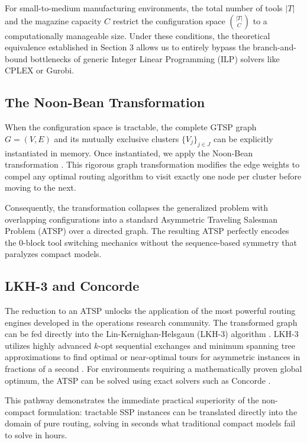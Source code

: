 \documentclass[12pt]{article}
\begin{document}
	For small-to-medium manufacturing environments, the total number of tools $|T|$ and the magazine capacity $C$ restrict the configuration space $\binom{|T|}{C}$ to a computationally manageable size. Under these conditions, the theoretical equivalence established in Section 3 allows us to entirely bypass the branch-and-bound bottlenecks of generic Integer Linear Programming (ILP) solvers like CPLEX or Gurobi.
	
	\subsection{The Noon-Bean Transformation}
	When the configuration space is tractable, the complete GTSP graph $G = (V, E)$ and its mutually exclusive clusters $\{V_j\}_{j \in J}$ can be explicitly instantiated in memory. Once instantiated, we apply the Noon-Bean transformation \parencite{Noon1993}. This rigorous graph transformation modifies the edge weights to compel any optimal routing algorithm to visit exactly one node per cluster before moving to the next.
	
	Consequently, the transformation collapses the generalized problem with overlapping configurations into a standard Asymmetric Traveling Salesman Problem (ATSP) over a directed graph. The resulting ATSP perfectly encodes the 0-block tool switching mechanics without the sequence-based symmetry that paralyzes compact models.
	
	\subsection{LKH-3 and Concorde}
	The reduction to an ATSP unlocks the application of the most powerful routing engines developed in the operations research community. The transformed graph can be fed directly into the Lin-Kernighan-Helsgaun (LKH-3) algorithm \parencite{Helsgaun2015}. LKH-3 utilizes highly advanced $k$-opt sequential exchanges and minimum spanning tree approximations to find optimal or near-optimal tours for asymmetric instances in fractions of a second \parencite{Helsgaun2015}. For environments requiring a mathematically proven global optimum, the ATSP can be solved using exact solvers such as Concorde \parencite{Applegate2006}. 
	
	This pathway demonstrates the immediate practical superiority of the non-compact formulation: tractable SSP instances can be translated directly into the domain of pure routing, solving in seconds what traditional compact models fail to solve in hours.
	
\end{document}
